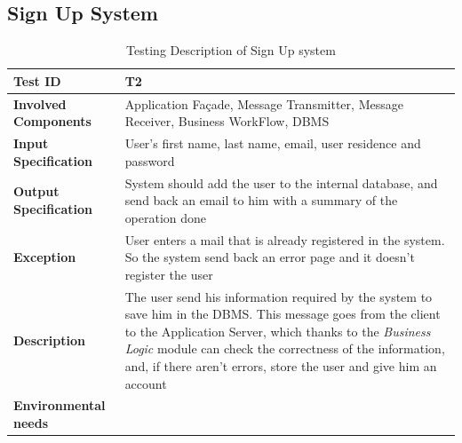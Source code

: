\subsection*{Sign Up System}

\begin{table}[H]
    \centering
    \begin{tabular}{p{4.55cm} p{7cm}}
        
        \hline
        
        \textbf{Test ID}                & T2 \\
        
        \hline
        
        \textbf{Involved Components}    & Application Façade, Message Transmitter, Message Receiver, Business                                          WorkFlow, DBMS\\
        
        \hline
        
        \textbf{Input Specification}    & User's first name, last name, email, user residence and password\\
        
        \hline
        
        \textbf{Output Specification}   & System should add the user to the internal database, and send back an email to him with a summary of the operation done\\
        
        \hline
        
        \textbf{Exception}              & User enters a mail that is already registered in the system. So the system send back an error page and it doesn't register the user\\
        
        \hline
        
        \textbf{Description}            & The user send his information required by the system to save him in the DBMS. This message goes from the client to the Application Server, which thanks to the \emph{Business Logic} module can check the correctness of the information, and, if there aren't errors, store the user and give him an account\\
        
        \hline
        
        \textbf{Environmental needs}    & \\
        
        \hline
        
    \end{tabular}
    \caption{Testing Description of Sign Up system}
\end{table}



